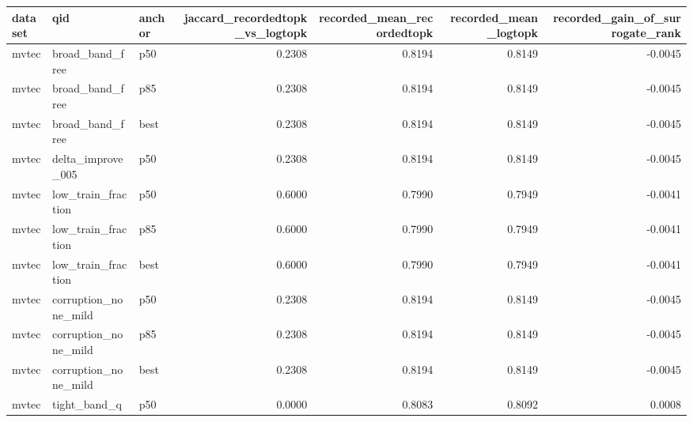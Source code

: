\begin{tabular}{lllrrrr}
\toprule
 dataset &                  qid & anchor &  jaccard\_recordedtopk\_vs\_logtopk &  recorded\_mean\_recordedtopk &  recorded\_mean\_logtopk &  recorded\_gain\_of\_surrogate\_rank \\
\midrule
   mvtec &      broad\_band\_free &    p50 &                           0.2308 &                      0.8194 &                 0.8149 &                          -0.0045 \\
   mvtec &      broad\_band\_free &    p85 &                           0.2308 &                      0.8194 &                 0.8149 &                          -0.0045 \\
   mvtec &      broad\_band\_free &   best &                           0.2308 &                      0.8194 &                 0.8149 &                          -0.0045 \\
   mvtec &    delta\_improve\_005 &    p50 &                           0.2308 &                      0.8194 &                 0.8149 &                          -0.0045 \\
   mvtec &   low\_train\_fraction &    p50 &                           0.6000 &                      0.7990 &                 0.7949 &                          -0.0041 \\
   mvtec &   low\_train\_fraction &    p85 &                           0.6000 &                      0.7990 &                 0.7949 &                          -0.0041 \\
   mvtec &   low\_train\_fraction &   best &                           0.6000 &                      0.7990 &                 0.7949 &                          -0.0041 \\
   mvtec & corruption\_none\_mild &    p50 &                           0.2308 &                      0.8194 &                 0.8149 &                          -0.0045 \\
   mvtec & corruption\_none\_mild &    p85 &                           0.2308 &                      0.8194 &                 0.8149 &                          -0.0045 \\
   mvtec & corruption\_none\_mild &   best &                           0.2308 &                      0.8194 &                 0.8149 &                          -0.0045 \\
   mvtec &         tight\_band\_q &    p50 &                           0.0000 &                      0.8083 &                 0.8092 &                           0.0008 \\

\end{tabular}
